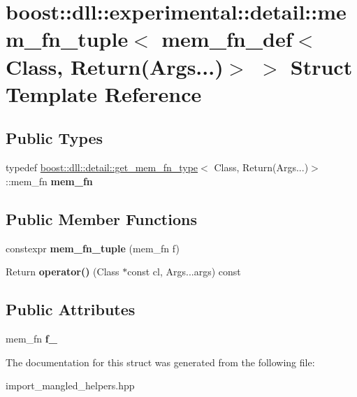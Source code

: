 \hypertarget{a01540}{}\section{boost\+:\+:dll\+:\+:experimental\+:\+:detail\+:\+:mem\+\_\+fn\+\_\+tuple$<$ mem\+\_\+fn\+\_\+def$<$ Class, Return(Args...)$>$ $>$ Struct Template Reference}
\label{a01540}
\subsection*{Public Types}
\begin{DoxyCompactItemize}
\item 
\mbox{\label{a01540_a7c02503c22f0eba2ba3c9c6b877c2ee2}} 
typedef \hyperlink{a01412}{boost\+::dll\+::detail\+::get\+\_\+mem\+\_\+fn\+\_\+type}$<$ Class, Return(Args...)$>$\+::mem\+\_\+fn {\bfseries mem\+\_\+fn}
\end{DoxyCompactItemize}
\subsection*{Public Member Functions}
\begin{DoxyCompactItemize}
\item 
\mbox{\label{a01540_a06b433063d7246de4378096547995c42}} 
constexpr {\bfseries mem\+\_\+fn\+\_\+tuple} (mem\+\_\+fn f)
\item 
\mbox{\label{a01540_a24b65c533be42999358e63a10efac6d3}} 
Return {\bfseries operator()} (Class $\ast$const cl, Args...\+args) const
\end{DoxyCompactItemize}
\subsection*{Public Attributes}
\begin{DoxyCompactItemize}
\item 
\mbox{\label{a01540_a7d61345644e21c2e433eaf5e459c9c74}} 
mem\+\_\+fn {\bfseries f\+\_\+}
\end{DoxyCompactItemize}


The documentation for this struct was generated from the following file\+:\begin{DoxyCompactItemize}
\item 
import\+\_\+mangled\+\_\+helpers.\+hpp\end{DoxyCompactItemize}
